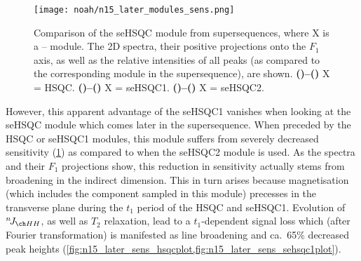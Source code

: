 \begin{figure}[!ht]
    \centering
    \texttt{[image: noah/n15\_later\_modules\_sens.png]}%
    {\label{fig:n15_later_sens_hsqc}}%
    {\label{fig:n15_later_sens_hsqcp}}%
    {\label{fig:n15_later_sens_hsqcplot}}%
    {\label{fig:n15_later_sens_sehsqc1}}%
    {\label{fig:n15_later_sens_sehsqc1p}}%
    {\label{fig:n15_later_sens_sehsqc1plot}}%
    {\label{fig:n15_later_sens_sehsqc2}}%
    {\label{fig:n15_later_sens_sehsqc2p}}%
    {\label{fig:n15_later_sens_sehsqc2plot}}%
    \caption[Comparison of \carbon{} seHSQC sensitivity when preceded by different \nitrogen{} modules]{
        Comparison of the \carbon{} seHSQC module from  supersequences, where X is a \proton{}--\nitrogen{} module.
        The 2D spectra, their positive projections onto the $F_1$ axis, as well as the relative intensities of all peaks (as compared to the corresponding module in the  supersequence), are shown.
        \textbf{()--()} X = \nitrogen{} HSQC.
        \textbf{()--()} X = \nitrogen{} seHSQC1.
        \textbf{()--()} X = \nitrogen{} seHSQC2.
    }
    \label{fig:n15_later_sens}
\end{figure}

However, this apparent advantage of the seHSQC1 vanishes when looking at the \carbon{} seHSQC module which comes later in the supersequence.
When preceded by the \nitrogen{} HSQC or seHSQC1 modules, this module suffers from severely decreased sensitivity (\cref{fig:n15_later_sens}) as compared to when the seHSQC2 module is used.
As the spectra and their $F_1$ projections show, this reduction in sensitivity actually stems from broadening in the indirect dimension.
This in turn arises because  magnetisation (which includes the  component sampled in this module) precesses in the transverse plane during the $t_1$ period of the \nitrogen{} HSQC and seHSQC1.
Evolution of $\nJ{HH}$, as well as $T_2$ relaxation, lead to a $t_1$-dependent signal loss which (after Fourier transformation) is manifested as line broadening and ca.\ 65\% decreased peak heights (\cref{fig:n15_later_sens_hsqcplot,fig:n15_later_sens_sehsqc1plot}).

